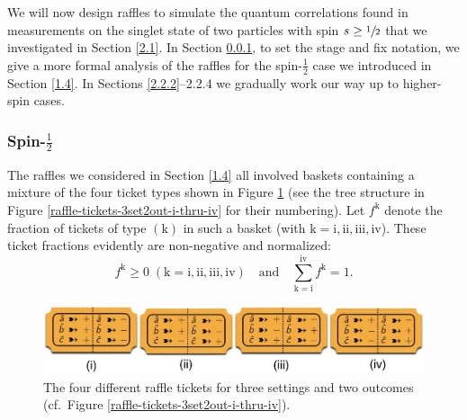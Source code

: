 

We will now design raffles to simulate the quantum correlations found in measurements on the singlet state of two particles with spin $s \ge \sfrac12$ that we investigated in Section \ref{2.1}. In Section \ref{2.2.1}, to set the stage and fix notation, we give a more formal analysis of the raffles for the spin-$\frac12$ case we introduced in Section \ref{1.4}. In Sections \ref{2.2.2}--{2.2.4} we gradually work our way up to higher-spin cases. 

\subsubsection{Spin-$\frac12$}  \label{2.2.1}

The raffles we considered in Section \ref{1.4} all involved baskets containing a mixture of the four ticket types shown in Figure \ref{raffle-tickets-3set2out-i-thru-iv-row} (see the tree structure in Figure \ref{raffle-tickets-3set2out-i-thru-iv} for their numbering). Let $f^{\mathrm{k}}$ denote the fraction of tickets of type $(\mathrm{k})$ in such a basket (with $\mathrm{k} = \mathrm{i}, \mathrm{ii}, \mathrm{iii}, \mathrm{iv}$). These ticket fractions evidently are non-negative and normalized:
\begin{equation}
f^{\mathrm{k}}\geq 0 \; (\mathrm{k} = \mathrm{i}, \mathrm{ii}, \mathrm{iii}, \mathrm{iv}) \quad\text{and}\quad \sum_{\mathrm{k=i}}^{\mathrm{iv}} f^{\mathrm{k}}=1.
  \label{3-simplex}
\end{equation}

\begin{figure}[ht]
 \centering
   \includegraphics[width=4.5in]{raffle-tickets-3set2out-i-thru-iv-row.jpeg} 
   \caption{The four different raffle tickets for three settings and two outcomes (cf.\ Figure \ref{raffle-tickets-3set2out-i-thru-iv}).}
   \label{raffle-tickets-3set2out-i-thru-iv-row}
   \end{figure}
   
